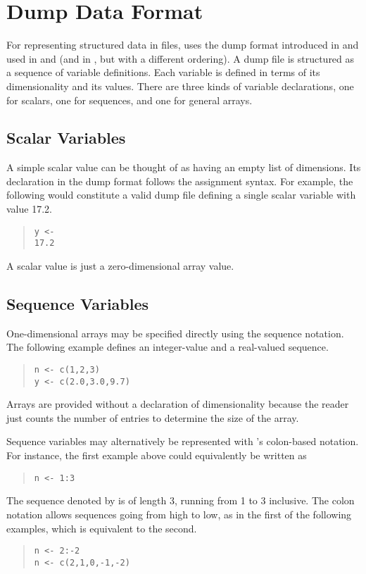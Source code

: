 \chapter{Dump Data Format}\label{dump.chapter}

\noindent 
For representing structured data in files, \Stan uses the dump format
introduced in \SPLUS and used in \R and \JAGS (and in \BUGS, but with
a different ordering).   A dump file is structured as a sequence of
variable definitions.  Each variable is defined in terms of its
dimensionality and its values.   There are three kinds of variable
declarations, one for scalars, one for sequences, and one for general
arrays.

\section{Scalar Variables}

A simple scalar value can be thought of as having an empty list of
dimensions.  Its declaration in the dump format follows the \SPLUS
assignment syntax.  For example, the following would constitute a
valid dump file defining a single scalar variable  with value
17.2.
%
\begin{quote}
\begin{Verbatim}
y <- 
17.2
\end{Verbatim}
\end{quote}
%
A scalar value is just a zero-dimensional array value.

\section{Sequence Variables}

One-dimensional arrays may be specified directly using the \SPLUS
sequence notation.  The following example defines an integer-value and
a real-valued sequence.
%
\begin{quote}
\begin{Verbatim}
n <- c(1,2,3)
y <- c(2.0,3.0,9.7)
\end{Verbatim}
\end{quote}
%
Arrays are provided without a declaration of dimensionality because
the reader just counts the number of entries to determine the size of
the array.

Sequence variables may alternatively be represented with \R's
colon-based notation.  For instance, the first example above could
equivalently be written as
%
\begin{quote}
\begin{Verbatim} 
n <- 1:3
\end{Verbatim}
\end{quote}
% 
The sequence denoted by  is of length 3, running from 1 to 3
inclusive.  The colon notation allows sequences going from high to
low, as in the first of the following examples, which is equivalent to
the second.
%
\begin{quote}
\begin{Verbatim}
n <- 2:-2
n <- c(2,1,0,-1,-2)
\end{Verbatim}
\end{quote}
%



